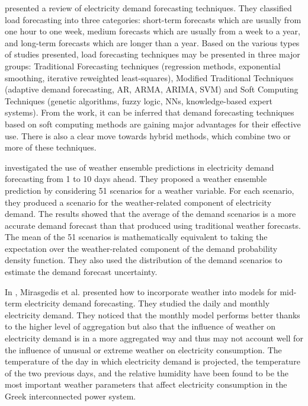 \cite{singh2013overview} presented a review of electricity demand forecasting techniques.
They classified load forecasting into three categories:
short-term forecasts which are usually from one hour to one week,
medium forecasts which are usually from a week to a year,
and long-term forecasts which are longer than a year.
Based on the various types of studies presented, load forecasting techniques may be presented in three major groups: Traditional Forecasting techniques (regression methods, exponential smoothing, iterative reweighted least-squares), Modified Traditional Techniques (adaptive demand forecasting, AR, ARMA, ARIMA, SVM) and Soft Computing Techniques (genetic algorithms, fuzzy logic, NNs, knowledge-based expert systems).
From the work, it can be inferred that demand forecasting techniques based on soft computing methods are gaining major advantages for their effective use.
There is also a clear move towards hybrid methods, which combine two or more of these techniques.

\cite{TAYLOR200357} investigated the use of weather ensemble predictions in electricity demand forecasting from 1 to 10 days ahead.
They proposed a weather ensemble prediction by considering 51 scenarios for a weather variable.
For each scenario, they produced a scenario for the weather-related component of electricity demand.
The results showed that the average of the demand scenarios is a more accurate demand forecast than that produced using traditional weather forecasts.
The mean of the 51 scenarios is mathematically equivalent to taking the expectation over the weather-related component of the demand probability density function.
They also used the distribution of the demand scenarios to estimate the demand forecast uncertainty.

In \cite{MIRASGEDIS2006208}, Mirasgedis et al. presented how to incorporate weather into models for mid-term electricity demand forecasting.
They studied the daily and monthly electricity demand.
They noticed that the monthly model performs better thanks to the higher level of aggregation but also that the influence of weather on electricity demand is in a more aggregated way and thus may not account well for the influence of unusual or extreme weather on electricity consumption.
The temperature of the day in which electricity demand is projected, the temperature of the two previous days, and the relative humidity have been found to be the most important weather parameters that affect electricity consumption in the Greek interconnected power system.

